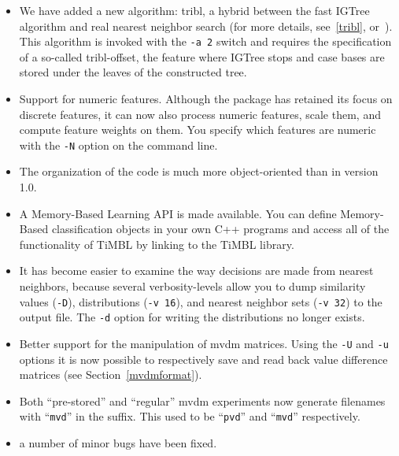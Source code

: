 \documentclass{book}
\begin{document}
\begin{itemize}

\item We have added a new algorithm: {\sc tribl}, a hybrid between
the fast {\sc IGTree} algorithm and real nearest neighbor search (for
more details, see~\ref{tribl}, or~). This
algorithm is invoked with the {\tt -a 2} switch and requires the
specification of a so-called {\sc tribl}-offset, the feature where
{\sc IGTree} stops and case bases are stored under the leaves of the
constructed tree.

\item Support for numeric features. Although the package has retained
its focus on discrete features, it can now also process numeric
features, scale them, and compute feature weights on them. You
specify which features are numeric with the {\tt -N} option on the
command line.

\item The organization of the code is much more object-oriented than
in version 1.0.

\item A Memory-Based Learning API is made available. You can define
Memory-Based classification objects in your own C++ programs and
access all of the functionality of TiMBL by linking to the TiMBL
library.

\item It has become easier to examine the way decisions are made from
nearest neighbors, because several verbosity-levels allow you to dump
similarity values ({\tt -D}), distributions ({\tt -v 16}), and nearest
neighbor sets ({\tt -v 32}) to the output file. The {\tt -d} option
for writing the distributions no longer exists.

\item Better support for the manipulation of {\sc mvdm}
matrices. Using the {\tt -U} and {\tt -u} options it is now possible
to respectively save and read back value difference matrices (see
Section~\ref{mvdmformat}).

\item Both ``pre-stored'' and ``regular'' {\sc mvdm} experiments now
generate filenames with ``{\tt mvd}'' in the suffix. This used to be
``{\tt pvd}'' and ``{\tt mvd}'' respectively.

\item a number of minor bugs have been fixed.

\end{itemize}
\end{document}
